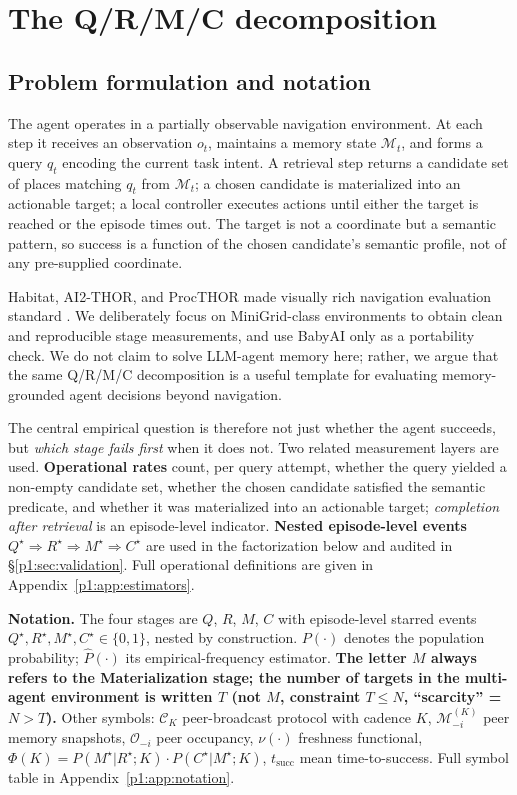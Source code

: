 \documentclass{article}
\begin{document}
\section{The Q/R/M/C decomposition}
\label{p1:sec:framework}

\subsection{Problem formulation and notation}
\label{p1:sec:notation}

The agent operates in a partially observable navigation environment.
At each step it receives an observation $o_t$, maintains a memory
state $\mathcal{M}_t$, and forms a query $q_t$ encoding the current
task intent. A retrieval step returns a candidate set of places
matching $q_t$ from $\mathcal{M}_t$; a chosen candidate is
materialized into an actionable target; a local controller executes
actions until either the target is reached or the episode times out.
The target is not a coordinate but a semantic pattern, so success is a
function of the chosen candidate's semantic profile, not of any
pre-supplied coordinate.

Habitat, AI2-THOR, and ProcTHOR made visually rich navigation
evaluation standard
\citep{savva2019habitat,kolve2017ai2thor,deitke2022procthor}. We
deliberately focus on MiniGrid-class environments to obtain clean and
reproducible stage measurements, and use BabyAI only as a portability
check. We do not claim to solve LLM-agent memory here; rather, we
argue that the same Q/R/M/C decomposition is a useful template for
evaluating memory-grounded agent decisions beyond navigation.

The central empirical question is therefore not just whether the agent
succeeds, but \emph{which stage fails first} when it does not. Two
related measurement layers are used. \textbf{Operational rates} count,
per query attempt, whether the query yielded a non-empty candidate
set, whether the chosen candidate satisfied the semantic predicate,
and whether it was materialized into an actionable target;
\emph{completion after retrieval} is an episode-level indicator.
\textbf{Nested episode-level events}
$Q^\star \Rightarrow R^\star \Rightarrow M^\star \Rightarrow C^\star$
are used in the factorization below and audited in
\S\ref{p1:sec:validation}. Full operational definitions are given in
Appendix~\ref{p1:app:estimators}.

\textbf{Notation.} The four stages are $Q$, $R$, $M$, $C$ with episode-level starred events $Q^\star,R^\star,M^\star,C^\star\!\in\!\{0,1\}$, nested by construction. $P(\cdot)$ denotes the population probability; $\hat{P}(\cdot)$ its empirical-frequency estimator. \textbf{The letter $M$ always refers to the Materialization stage; the number of targets in the multi-agent environment is written $T$ (not $M$, constraint $T{\le}N$, ``scarcity'' = $N{>}T$).} Other symbols: $\mathcal{C}_K$ peer-broadcast protocol with cadence $K$, $\mathcal{M}_{-i}^{(K)}$ peer memory snapshots, $\mathcal{O}_{-i}$ peer occupancy, $\nu(\cdot)$ freshness functional, $\Phi(K){=}P(M^\star|R^\star;K)\!\cdot\!P(C^\star|M^\star;K)$, $t_{\mathrm{succ}}$ mean time-to-success. Full symbol table in Appendix~\ref{p1:app:notation}.
\end{document}
